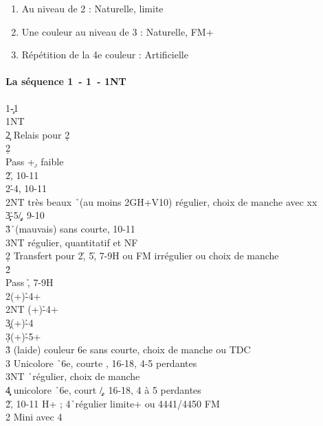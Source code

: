 \documentclass[a4paper]{article}
\begin{document}
\begin{enumerate}
\item Au niveau de 2 : Naturelle, limite

\item Une couleur au niveau de 3 : Naturelle, FM+

\item Répétition de la 4e couleur : Artificielle

\end{enumerate}

\paragraph{La séquence 1\pdfc\ - 1\pdfd\ - 1NT}

\begin{bidtable}
1\c-1\d\\
1NT\+\\
2\c \> Relais pour 2\d \+\\
2\d\+\\
Pass +\d , faible\\
2\h {}\h , 10-11\\
2\s {}\h -4\s , 10-11\\
2NT  très beaux \h\ (au moins 2GH+V10) régulier, choix de manche avec xx\\
3\c\d {}\h -5\c /\d , 9-10\\
3\h {}\h\ (mauvais) sans courte, 10-11\\
3NT \> régulier, quantitatif et NF\-\-\\
2\d \> Transfert pour 2\h , 5\h , 7-9H ou FM irrégulier ou choix de manche\+\\
2\h\+\\
Pass \h , 7-9H\\
2\s {}(+)\h -4+\s \\
2NT (+)\h -4+\c \\
3\c {}(+)\h -4\d \\
3\d {}(+)\h -5+\d \\
3\h \> (laide) couleur 6e sans courte, choix de manche ou TDC\\
3\s \> Unicolore \h\ 6e, courte \s , 16-18, 4-5 perdantes\\
3NT \h\ régulier, choix de manche\\
4\c\d \> unicolore \h\ 6e, court \c /\d , 16-18, 4 à 5 perdantes\-\-\\
2\h {}\h , 10-11 H+ ; 4\h\ régulier limite+ ou 4441/4450 FM\+\\
2\s \> Mini avec 4\s \\

\end{bidtable}
\end{document}
